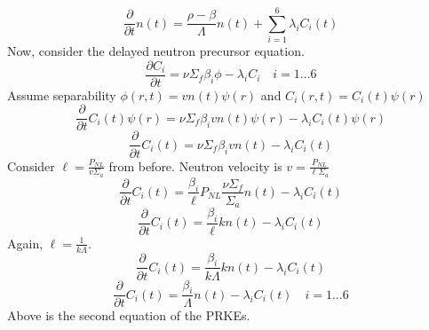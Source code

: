 \documentclass[]{article}
\begin{document}
	\[
	\frac{\partial}{\partial t}n(t)= \frac{\rho-\beta}{\Lambda}n(t)+\sum_{i=1}^{6}\lambda_i C_i(t)
	\]
	Now, consider the delayed neutron precursor equation.
	\[
	\frac{\partial C_i}{\partial t} = \nu\Sigma_f\beta_i\phi-\lambda_i C_i \quad i=1...6
	\]
	Assume separability $\phi(r,t) = vn(t)\psi(r)$ and $C_i(r,t) = C_i(t)\psi(r)$
	\[
	\frac{\partial}{\partial t}C_i(t)\psi(r) = \nu\Sigma_f\beta_i vn(t)\psi(r)-\lambda_iC_i(t)\psi(r)
	\]
	\[
	\frac{\partial}{\partial t}C_i(t) = \nu\Sigma_f\beta_i vn(t)-\lambda_iC_i(t)
	\]
	Consider $\ell = \frac{P_{NL}}{v\Sigma_a}$ from before. Neutron velocity is $v = \frac{P_{NL}}{\ell\Sigma_a}$
	\[
	\frac{\partial}{\partial t}C_i(t) = \frac{\beta_i} {\ell}P_{NL}\frac{\nu\Sigma_f}{\Sigma_a}n(t)-\lambda_iC_i(t)
	\]
	\[
	\frac{\partial}{\partial t}C_i(t) = \frac{\beta_i} {\ell}kn(t)-\lambda_iC_i(t)
	\]
	Again, $\ell=\frac{1}{k\Lambda}$.
	\[
	\frac{\partial}{\partial t}C_i(t) = \frac{\beta_i} {k\Lambda}kn(t)-\lambda_iC_i(t)
	\]
	\[
	\frac{\partial}{\partial t}C_i(t) =\frac{\beta_i}{\Lambda}n(t)-\lambda_iC_i(t) \quad i=1...6
	\]
	Above is the second equation of the PRKEs.
\end{document}
